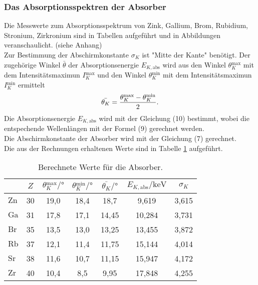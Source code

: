 \subsubsection{Das Absorptionsspektren der Absorber}
Die Messwerte zum Absorptionsspektrum von Zink, Gallium, Brom, Rubidium, Stronium, Zirkronium sind in Tabellen aufgeführt und in Abbildungen veranschaulicht. (siehe Anhang)\\
Zur Bestimmung der Abschirmkonstante $\sigma_K$ ist "Mitte der Kante" benötigt.
 Der zugehörige Winkel $\bar{\theta}$ der Absorptionsenergie $E_{K,\text{abs}}$ wird aus den Winkel $\theta{^{\text{max}} _K}$ mit dem Intensitätsmaximun $I{^{\text{max}} _K}$ und den Winkel $\theta{^{\text{min}} _K}$ mit dem Intensitätsmaximun $I{^{\text{min}} _K}$ ermittelt
\begin{equation}
    \bar{\theta_K}= \frac{\theta{^{\text{max}} _K}-\theta{^{\text{min}} _K}}{2}.\\
   \end{equation}
Die Absorptionsenergie $E_{K,\text{abs}}$ wird mit der Gleichung (10) bestimmt, wobei die entspechende Wellenlängen mit der Formel (9) gerechnet werden.\\
Die Abschirmkonstante der Absorber wird mit der Gleichung (7) gerechnet.\\
Die aus der Rechnungen erhaltenen Werte sind in Tabelle \ref{tab:Berechnetwerte} aufgeführt.
\begin{table}[H]
    \centering
    \caption{Berechnete Werte für die Absorber.}
    \label{tab:Berechnetwerte}
    \begin{tabular}{|l|c|c|c|c|c|c|}
      \toprule
        {} & $Z$  &$\theta{^{\text{max}} _K}/\mathrm{°}$   & $\theta{^{\text{min}} _K}/\mathrm{°}$   & $\bar{\theta_K}/\mathrm{°}$ & $E_{K,\text{abs}}/\mathrm{keV} $ & $\sigma_K$\\
        \midrule
        $\text{Zn}$&30&19,0&18,4&18,7&9,619&3,615\\
        $\text{Ga}$&31&17,8&17,1&14,45&10,284&3,731\\
        $\text{Br}$&35&13,5&13,0&13,25&13,455&3,872\\
        $\text{Rb}$&37&12,1&11,4&11,75&15,144&4,014\\
        $\text{Sr}$&38&11,6&10,7&11,15&15,947&4,172\\
        $\text{Zr}$&40&10,4&8,5&9,95&17,848&4,255\\

        \bottomrule
        \end{tabular}
\end{table}





